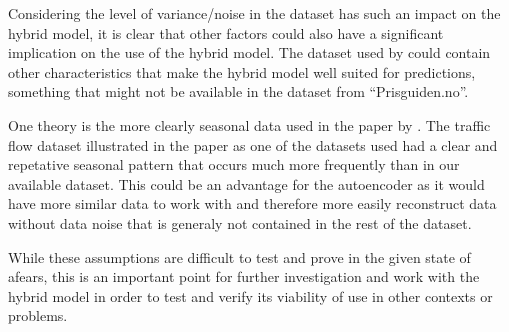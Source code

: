 Considering the level of variance/noise in the dataset has such an impact on the hybrid model, it
is clear that other factors could also have a significant implication on the use of the hybrid model.
The dataset used by \cite{Zhao2019} could contain other characteristics that make the hybrid model well suited for predictions,
something that might not be available in the dataset from ``Prisguiden.no''.

One theory is the more clearly seasonal data used in the paper by \cite{Zhao2019}.
The traffic flow dataset illustrated in the paper as one of the datasets used had a clear and repetative seasonal
pattern that occurs much more frequently than in our available dataset.
This could be an advantage for the autoencoder as it would have more similar data to work with and therefore more easily
reconstruct data without data noise that is generaly not contained in the rest of the dataset.

While these assumptions are difficult to test and prove in the given state of afears,
this is an important point for further investigation and work with the hybrid model in order
to test and verify its viability of use in other contexts or problems.






